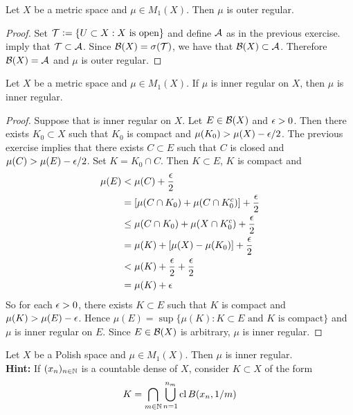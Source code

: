 \documentclass{book}
\begin{document}
	\begin{ex} 
		Let $X$ be a metric space and $\mu \in M_1(X)$. Then $\mu$ is outer regular.
	\end{ex}
	
	\begin{proof}
		Set $\mathcal{T} \vcentcolon= \{U \subset X: X \text{ is open}\}$ and define $\mathcal{A}$ as in the previous exercise.  imply that $\mathcal{T} \subset \mathcal{A}$. Since $\mathcal{B}(X) = \sigma(\mathcal{T})$, we have that $\mathcal{B}(X) \subset \mathcal{A}$. Therefore $\mathcal{B}(X) = \mathcal{A}$ and $\mu$ is outer regular.  
	\end{proof}
	
	\begin{ex} 
		Let $X$ be a metric space and $\mu \in M_1(X)$. If $\mu$ is inner regular on $X$, then $\mu$ is inner regular.
	\end{ex}
	
	\begin{proof}
		Suppose that is inner regular on $X$. Let $E \in \mathcal{B}(X)$ and $\epsilon >0$. Then there exists $K_0 \subset X$ such that $K_0$ is compact and $\mu(K_0) > \mu(X) - \epsilon/2$. The previous exercise implies that there exists $C \subset E$ such that $C$ is closed and $\mu(C) > \mu(E) - \epsilon/2$. Set $K = K_0 \cap C$. Then $K \subset E$, $K$ is compact and 
		\begin{align*}
			\mu(E)
			& < \mu(C) + \frac{\epsilon}{2} \\
			& =[ \mu(C \cap K_0) + \mu(C \cap K_0^c)] + \frac{\epsilon}{2} \\
			& \leq \mu(C \cap K_0) + \mu(X \cap K_0^c) + \frac{\epsilon}{2} \\
			&= \mu(K) + [\mu(X) - \mu(K_0)] + \frac{\epsilon}{2} \\
			&< \mu(K) + \frac{\epsilon}{2} + \frac{\epsilon}{2} \\
			&= \mu(K) + \epsilon
		\end{align*}
		So for each $\epsilon >0$, there exists $K \subset E$ such that $K$ is compact and $\mu(K) > \mu(E) - \epsilon$. Hence $\mu(E) = \sup\{\mu(K): K \subset E \text{ and  $K$ is compact}\}$ and $\mu$ is inner regular on $E$. Since $E \in \mathcal{B}(X)$ is arbitrary, $\mu$ is inner regular.
	\end{proof}
	
	\begin{ex} 
		Let $X$ be a Polish space and $\mu \in M_1(X)$. Then $\mu$ is inner regular. \\
		\textbf{Hint:} If $(x_{n})_{n \in \mathbb{N}}$ is a countable dense of $X$, consider $K \subset X$ of the form 
		$$K = \bigcap\limits_{m \in \mathbb{N}} \bigcup\limits_{n = 1}^{n_m} \operatorname{cl} B(x_n, 1/m)$$
	\end{ex}
	
\end{document}
